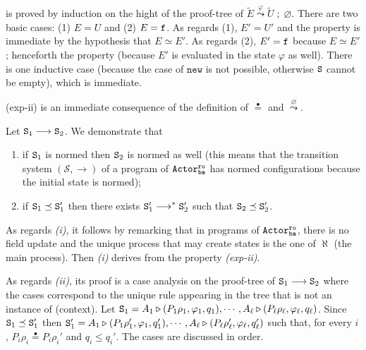 \documentclass{LMCS}
\newcommand{\cal}{\mathcal}
\theoremstyle{plain}\newtheorem{proposition}[thm]{Proposition}
\theoremstyle{plain}\newtheorem{lemma}[thm]{Lemma}
\theoremstyle{plain}\newtheorem{theorem}[thm]{Theorem}
\theoremstyle{plain}\newtheorem{corollary}[thm]{Corollary}
\newcommand{\rulename}[1]{{\sc(#1)}}
\newcommand{\State}{{\tt S}}
\newcommand{\lred}[1]{\stackrel{#1}{\longrightarrow}}
\newcommand{\lleadsto}[1]{\stackrel{#1}{\leadsto}}
\newcommand{\f}{{\tt f}}
\newcommand{\wt}[1]{\widetilde{#1}}
\newcommand{\eqdot}{\stackrel{\bullet}{=}}
\newcommand{\actroba}{${\tt Actor^{\tt ro}_{\tt ba}}$}
\begin{document}
 is proved by induction on the hight of the proof-tree of 
$\wt{E} \lleadsto{\varphi} \wt{U}\; ; \; \varnothing$. There are two basic cases:
(1) $E = U$ and (2) $E = \f$. As regards (1), $E' = U'$ and the property is
immediate by the hypothesis that $E \simeq E'$. As regards (2), $E' = \f$ because
$E \simeq E'$; henceforth the property (because $E'$ is evaluated in the state 
$\varphi$ as well). There is one inductive case (because the case of $\mathtt{new}$
is not possible, otherwise $\State$ cannot be empty), which is immediate.

{(exp-ii)} is an immediate consequence of the definition of $\eqdot$ and
$\lleadsto{\varnothing}$.

\bigskip

\noindent Let $\State_1 \lred{} \State_2$. We demonstrate that 

\begin{enumerate}[label=(\roman*)]
\item if $\State_1$ is normed then $\State_2$ is normed as well
(this means that the transition system $({\cal S},\lred{})$ of a program
of {\actroba} has normed configurations because the initial state is normed);

\item if $\State_1 \preceq \State_1'$ then there exists $\State_1' \lred{}^* \State_2'$ such that $\State_2 \preceq \State_2'$.
\end{enumerate}
As regards \emph{(i)}, it follows by remarking that in programs of {\actroba},
there is no field update and the unique process
that may create states is the one of $\aleph$ (the main process). Then 
\emph{(i)} derives from the property \emph{(exp-ii)}.

As regards \emph{(ii)}, its proof is a case analysis on the proof-tree of 
$\State_1 \lred{} \State_2$ where the cases correspond to the unique rule appearing
in the tree that is not an instance of \rulename{context}. 
Let $\State_1 = A_1 \triangleright (P_1\rho_1, \varphi_1, q_1),
\cdots , A_\ell  \triangleright (P_\ell \rho_\ell, \varphi_\ell, q_\ell)$. Since $\State_1 
\preceq \State_1'$ then 
$\State_1' = A_1 \triangleright (P_1\rho_1', \varphi_1, q_1'),
\cdots ,  A_\ell  \triangleright (P_\ell\rho_\ell', \varphi_\ell,
q_\ell')$ such that, for every
$i$, 
$P_i \rho_i \eqdot P_i \rho_i'$ and $q_i \leq q_i'$. 
The cases are discussed in order.
\end{document}
